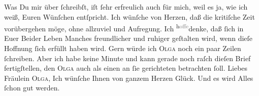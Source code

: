 \pstart
           Was Du mir über \label{K_L03097-2v}\label{K_L03097-2}{ }ſchreibſt, iſt{ }ſehr erfreulich auch für mich, weil es ja, wie ich
               weiß, Euren Wünſchen entſpricht. Ich wünſche von Herzen, daß die kritiſche Zeit
               vorübergehen möge, ohne  allzuviel \label{K_L03097-3v}\label{K_L03097-3} und Aufregung. Ich \substVorne{}\textsuperscript{h\textcolor{gray}{offe}}\substDazwischen{}denke\substHinten{}, daß{ }ſich in Euer Beider Leben Manches freundlicher {\pb}und ruhiger geſtalten wird, wenn dieſe Hoffnung{ }ſich
               erfüllt haben wird. Gern würde ich \textsc{Olga} noch ein paar
               Zeilen{ }ſchreiben. Aber ich habe keine Minute und kann gerade noch raſch dieſen Brief
               fertigſtellen, den \textsc{Olga} auch als einen an{ }ſie gerichteten
               betrachten{ }ſoll. Liebes Fräulein \textsc{Olga}, Ich wünſche Ihnen
               von ganzem Herzen Glück. Und es wird Alles{ }ſchon gut werden.\pend
           
